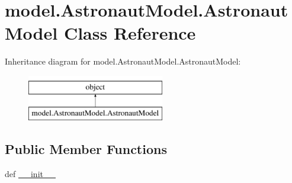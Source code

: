 \hypertarget{classmodel_1_1AstronautModel_1_1AstronautModel}{}\section{model.\+Astronaut\+Model.\+Astronaut\+Model Class Reference}
\label{classmodel_1_1AstronautModel_1_1AstronautModel}
Inheritance diagram for model.\+Astronaut\+Model.\+Astronaut\+Model\+:\begin{figure}[H]
\begin{center}
\leavevmode
\includegraphics[height=2.000000cm]{classmodel_1_1AstronautModel_1_1AstronautModel}
\end{center}
\end{figure}
\subsection*{Public Member Functions}
\begin{DoxyCompactItemize}
\item 
def \hyperlink{classmodel_1_1AstronautModel_1_1AstronautModel_acf57c389f77b47f834fd3e2959f058d9}{\+\_\+\+\_\+init\+\_\+\+\_\+}
\end{DoxyCompactItemize}
